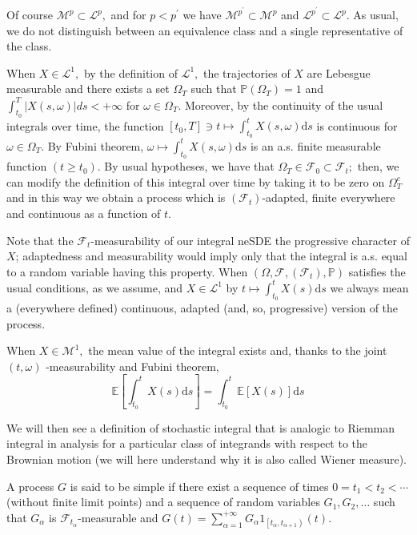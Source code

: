 	Of course $\mathcal{M}^{p} \subset \mathcal{L}^{p},$ and for $p<p^{\prime}$ we have $\mathcal{M}^{p^{\prime}} \subset \mathcal{M}^{p}$ and $\mathcal{L}^{p^{\prime}} \subset \mathcal{L}^{p} .$ As usual,
	we do not distinguish between an equivalence class and a single representative of the class.

	When $X \in \mathcal{L}^{1},$ by the definition of $\mathcal{L}^{1},$ the trajectories of $X$ are Lebesgue measurable and there exists a set $\Omega_{T}$ such that $\mathbb{P}\left(\Omega_{T}\right)=1$ and $\int_{t_{0}}^{T}|X(s, \omega)| d s<+\infty$ for $\omega \in \Omega_{T} .$ Moreover, by the continuity of the usual integrals over time, the function $\left[t_{0}, T\right] \ni t \mapsto \int_{t_{0}}^{t} X(s, \omega) \mathrm{d} s$ is continuous for $\omega \in \Omega_{T} .$ By Fubini theorem, $\omega \mapsto \int_{t_{0}}^{t} X(s, \omega) \mathrm{d} s$ is an a.s. finite measurable function $\left(t \geq t_{0}\right) .$ By usual hypotheses, we have that $\Omega_{T} \in \mathcal{F}_{0} \subset \mathcal{F}_{t} ;$ then, we can modify the definition of this integral over time by taking it to be zero on $\Omega_{T}^{c}$ and in this way we obtain a process which is $\left(\mathcal{F}_{t}\right)$-adapted, finite everywhere and continuous as a function of $t .$

	Note that the $\mathcal{F}_{t}$-measurability of our integral neSDE the progressive character of $X $; adaptedness and measurability would imply only that the integral is a.s. equal to a random variable having this property. When $\left(\Omega, \mathcal{F},\left(\mathcal{F}_{t}\right), \mathbb{P}\right)$ satisfies the usual conditions, as we assume, and $X \in \mathcal{L}^{1}$ by $t \mapsto \int_{t_{0}}^{t} X(s) \mathrm{d} s$ we always mean a (everywhere defined) continuous, adapted (and, so, progressive) version of the process.

	When $X \in \mathcal{M}^{1},$ the mean value of the integral exists and, thanks to the joint
	$(t, \omega)$ -measurability and Fubini theorem,
	\[
	\mathbb{E}\left[\int_{t_{0}}^{t} X(s) \mathrm{d} s\right]=\int_{t_{0}}^{t} \mathbb{E}[X(s)] \mathrm{d} s
	\]

	We will then see a definition of stochastic integral that is analogic to Riemman integral in analysis for a particular class of integrands with respect to the Brownian motion (we will here understand why it is also called Wiener measure).

	\begin{definition}
		A process $G$ is said to be simple if there exist a sequence of times $0=t_{1}<t_{2}<\cdots$ (without finite limit points) and a sequence of random variables $G_{1}, G_{2}, \ldots$ such that $G_{\alpha}$ is $\mathcal{F}_{t_{\alpha}}$-measurable and $G(t)=\sum_{\alpha=1}^{+\infty} G_{\alpha} 1_{\left[t_{\alpha}, t_{\alpha+1}\right)}(t) .$
	\end{definition}

